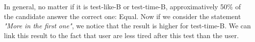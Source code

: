 In general, no matter if it is test-like-B or test-time-B, approximatively 50\% of the candidate answer the correct one: Equal. Now if we consider the statement \textit{"More in the first one"}, we notice that the result is higher for test-time-B. We can link this result to the fact that user are less tired after this test than the user.




